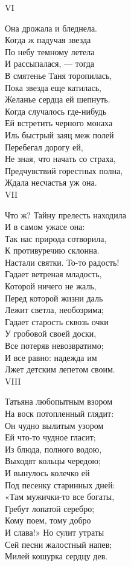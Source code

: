 VI

Она дрожала и бледнела.\\
Когда ж падучая звезда\\
По небу темному летела\\
И рассыпалася, — тогда\\
В смятенье Таня торопилась,\\
Пока звезда еще катилась,\\
Желанье сердца ей шепнуть.\\
Когда случалось где-нибудь\\
Ей встретить черного монаха\\
Иль быстрый заяц меж полей\\
Перебегал дорогу ей,\\
Не зная, что начать со страха,\\
Предчувствий горестных полна,\\
Ждала несчастья уж она.\\

VII

Что ж? Тайну прелесть находила\\
И в самом ужасе она:\\
Так нас природа сотворила,\\
К противуречию склонна.\\
Настали святки. То-то радость!\\
Гадает ветреная младость,\\
Которой ничего не жаль,\\
Перед которой жизни даль\\
Лежит светла, необозрима;\\
Гадает старость сквозь очки\\
У гробовой своей доски,\\
Все потеряв невозвратимо;\\
И все равно: надежда им\\
Лжет детским лепетом своим.\\

VIII

Татьяна любопытным взором\\
На воск потопленный глядит:\\
Он чудно вылитым узором\\
Ей что-то чудное гласит;\\
Из блюда, полного водою,\\
Выходят кольцы чередою;\\
И вынулось колечко ей\\
Под песенку старинных дней:\\
«Там мужички-то все богаты,\\
Гребут лопатой серебро;\\
Кому поем, тому добро\\
И слава!» Но сулит утраты\\
Сей песни жалостный напев;\\
Милей кошурка сердцу дев.\\

